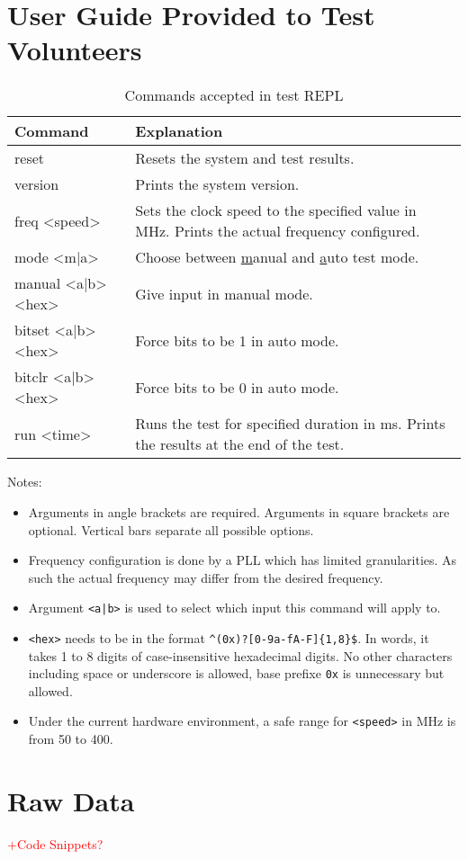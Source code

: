 \chapter{User Guide Provided to Test Volunteers}

\begin{table}[H]
  \centering
  \begin{tabular}{|>{\ttfamily}p{11em}|p{\dimexpr\textwidth-18em}|}
    \hline
    \textrm{Command}   & Explanation \\
    \hline
    reset              & Resets the system and test results. \\
    version            & Prints the system version. \\
    freq <speed>       & Sets the clock speed to the specified value in MHz. Prints the actual frequency configured. \\
    mode <m|a>         & Choose between \underline{m}anual and \underline{a}uto test mode. \\
    manual <a|b> <hex>  & Give input in manual mode. \\
    bitset <a|b> <hex>  & Force bits to be 1 in auto mode. \\
    bitclr <a|b> <hex>  & Force bits to be 0 in auto mode. \\
    run <time>         & Runs the test for specified duration in ms. Prints the results at the end of the test. \\
    \hline
  \end{tabular}
  \caption{Commands accepted in test REPL}
\end{table}

Notes:
\begin{itemize}
  \item Arguments in angle brackets are required. Arguments in square brackets are optional. Vertical bars separate all possible options.
  \item Frequency configuration is done by a PLL which has limited granularities. As such the actual frequency may differ from the desired frequency.
  \item Argument \texttt{<a|b>} is used to select which input this command will apply to.
  \item \texttt{<hex>} needs to be in the format \texttt{\textasciicircum(0x)?[0-9a-fA-F]\{1,8\}\$}. In words, it takes 1 to 8 digits of case-insensitive hexadecimal digits. No other characters including space or underscore is allowed, base prefixe \texttt{0x} is unnecessary but allowed.
  \item Under the current hardware environment, a safe range for \texttt{<speed>} in MHz is from 50 to 400.
\end{itemize}


\chapter{Raw Data}

\textcolor{red}{+Code Snippets?}
